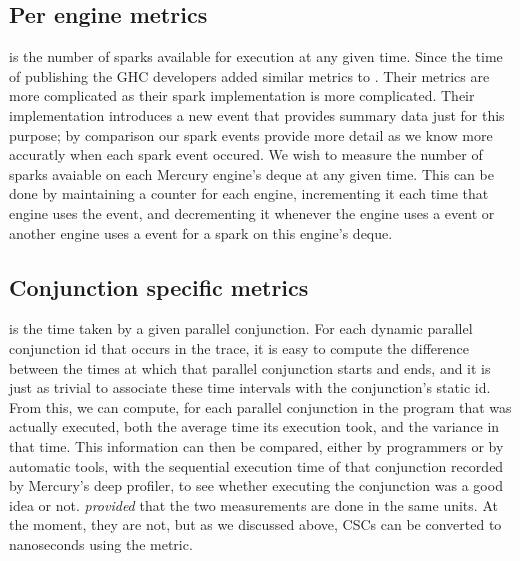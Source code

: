 

\subsection{Per engine metrics}

is the number of sparks available for execution at any given time.
Since the time of publishing \citet{bone:2011:tscope} the GHC developers
added similar metrics to \tscope.
Their metrics are more complicated as their spark implementation is more
complicated.
Their implementation introduces a new event that provides summary data just
for this purpose;
by comparison our spark events provide more detail as we know more accuratly
when each spark event occured.
We wish to measure the number of sparks avaiable on each Mercury engine's
deque at any given time.
This can be done by maintaining a counter for each engine,
incrementing it each time that engine uses the  event,
and decrementing it whenever the engine uses a  event or
another engine uses a  event for a spark on this
engine's deque.


\subsection{Conjunction specific metrics}

 is the time taken by a given parallel conjunction.
For each dynamic parallel conjunction id that occurs in the trace,
it is easy to compute the difference between
the times at which that parallel conjunction starts and ends,
and it is just as trivial to associate these time intervals
with the conjunction's static id.
From this, we can compute,
for each parallel conjunction in the program that was actually executed,
both the average time its execution took,
and the variance in that time.
This information can then be compared,
either by programmers or by automatic tools,
with the sequential execution time of that conjunction recorded by
Mercury's deep profiler,
to see whether executing the conjunction was a good idea or not.
\emph{provided} that the two measurements are done in the same units.
At the moment, they are not, but as we discussed above,
CSCs can be converted to nanoseconds using the 
metric.

